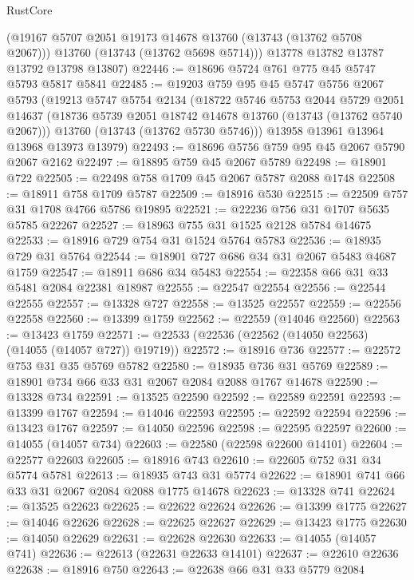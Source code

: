 \begin{lexlean}{RustCore}
\begin{coremodule}
        (@19167 @5707 @2051 @19173 @14678 @13760 (@13743 (@13762 @5708 @2067)))
        @13760
        (@13743 (@13762 @5698 @5714)))
      @13778
      @13782
      @13787
      @13792
      @13798
      @13807)
@22446 := @18696 @5724 @761 @775 @45 @5747 @5793 @5817 @5841
@22485 := @19203
    @759
    @95
    @45
    @5747
    @5756
    @2067
    @5793
    (@19213
      @5747
      @5754
      @2134
      (@18722
        @5746
        @5753
        @2044
        @5729
        @2051
        @14637
        (@18736 @5739 @2051 @18742 @14678 @13760 (@13743 (@13762 @5740 @2067)))
        @13760
        (@13743 (@13762 @5730 @5746)))
      @13958
      @13961
      @13964
      @13968
      @13973
      @13979)
@22493 := @18696 @5756 @759 @95 @45 @2067 @5790 @2067 @2162
@22497 := @18895 @759 @45 @2067 @5789
@22498 := @18901 @722
@22505 := @22498 @758 @1709 @45 @2067 @5787 @2088 @1748
@22508 := @18911 @758 @1709 @5787
@22509 := @18916 @530
@22515 := @22509 @757 @31 @1708 @4766 @5786 @19895
@22521 := @22236 @756 @31 @1707 @5635 @5785 @22267
@22527 := @18963 @755 @31 @1525 @2128 @5784 @14675
@22533 := @18916 @729 @754 @31 @1524 @5764 @5783
@22536 := @18935 @729 @31 @5764
@22544 := @18901 @727 @686 @34 @31 @2067 @5483 @4687 @1759
@22547 := @18911 @686 @34 @5483
@22554 := @22358 @66 @31 @33 @5481 @2084 @22381 @18987
@22555 := @22547 @22554
@22556 := @22544 @22555
@22557 := @13328 @727
@22558 := @13525 @22557
@22559 := @22556 @22558
@22560 := @13399 @1759
@22562 := @22559 (@14046 @22560)
@22563 := @13423 @1759
@22571 := @22533 (@22536 (@22562 (@14050 @22563) (@14055 (@14057 @727)) @19719))
@22572 := @18916 @736
@22577 := @22572 @753 @31 @35 @5769 @5782
@22580 := @18935 @736 @31 @5769
@22589 := @18901 @734 @66 @33 @31 @2067 @2084 @2088 @1767 @14678
@22590 := @13328 @734
@22591 := @13525 @22590
@22592 := @22589 @22591
@22593 := @13399 @1767
@22594 := @14046 @22593
@22595 := @22592 @22594
@22596 := @13423 @1767
@22597 := @14050 @22596
@22598 := @22595 @22597
@22600 := @14055 (@14057 @734)
@22603 := @22580 (@22598 @22600 @14101)
@22604 := @22577 @22603
@22605 := @18916 @743
@22610 := @22605 @752 @31 @34 @5774 @5781
@22613 := @18935 @743 @31 @5774
@22622 := @18901 @741 @66 @33 @31 @2067 @2084 @2088 @1775 @14678
@22623 := @13328 @741
@22624 := @13525 @22623
@22625 := @22622 @22624
@22626 := @13399 @1775
@22627 := @14046 @22626
@22628 := @22625 @22627
@22629 := @13423 @1775
@22630 := @14050 @22629
@22631 := @22628 @22630
@22633 := @14055 (@14057 @741)
@22636 := @22613 (@22631 @22633 @14101)
@22637 := @22610 @22636
@22638 := @18916 @750
@22643 := @22638 @66 @31 @33 @5779 @2084

\end{coremodule}
\end{lexlean}
